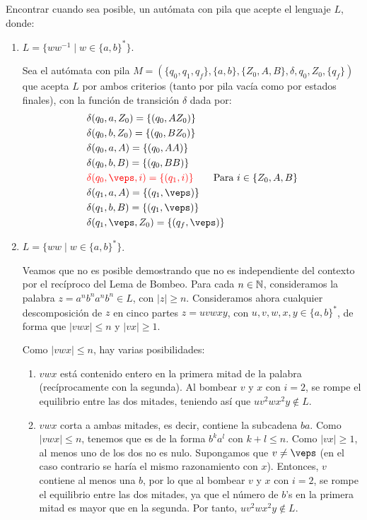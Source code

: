 \begin{ejercicio}\label{ej:1.6.2}
    Encontrar cuando sea posible, un autómata con pila que acepte el lenguaje $L$, donde:
    \begin{enumerate}
        \item \label{ej:1.6.2-1}
        $L = \{ww^{-1}\mid w\in {\{a,b\}}^{\ast}\}$.
        
        Sea el autómata con pila $M = (\{q_0,q_1,q_f\},\{a,b\},\{Z_0,A,B\},\delta,q_0,Z_0,\{q_f\})$ que acepta $L$ por ambos criterios (tanto por pila vacía como por estados finales), con la función de transición $\delta$ dada por:
        \begin{align*}
            &\delta(q_0,a,Z_0) = \{(q_0,AZ_0)\} \\
            &\delta(q_0,b,Z_0) = \{(q_0,BZ_0)\} \\
            &\delta(q_0,a,A) = \{(q_0,AA)\} \\
            &\delta(q_0,b,B) = \{(q_0,BB)\} \\
            &\red{\delta(q_0,\veps,i) = \{(q_1,i)\}} \qquad \text{Para } i\in \{Z_0,A,B\} \\
            &\delta(q_1,a,A) = \{(q_1,\veps)\} \\
            &\delta(q_1,b,B) = \{(q_1,\veps)\} \\
            &\delta(q_1,\veps,Z_0) = \{(q_f,\veps)\}
        \end{align*}
        \item $L = \{ww\mid w \in {\{a,b\}}^{\ast}\}$.
        
        Veamos que no es posible demostrando que no es independiente del contexto por el recíproco del Lema de Bombeo. Para cada $n\in \mathbb{N}$, consideramos la palabra $z=a^nb^na^nb^n\in L$, con $|z|\geq n$. Consideramos ahora cualquier descomposición de $z$ en cinco partes $z=uvwxy$, con $u,v,w,x,y\in {\{a,b\}}^{\ast}$, de forma que $|vwx|\leq n$ y $|vx|\geq 1$.

        Como $|vwx|\leq n$, hay varias posibilidades:
        \begin{enumerate}
            \item $vwx$ está contenido entero en la primera mitad de la palabra (recíprocamente con la segunda). Al bombear $v$ y $x$ con $i=2$, se rompe el equilibrio entre las dos mitades, teniendo así que $uv^2wx^2y\notin L$.
            \item $vwx$ corta a ambas mitades, es decir, contiene la subcadena $ba$. Como $|vwx|\leq n$, tenemos que es de la forma $b^k a^l$ con $k+l\leq n$. Como $|vx|\geq 1$, al menos uno de los dos no es nulo. Supongamos que $v\neq \veps$ (en el caso contrario se haría el mismo razonamiento con $x$). Entonces, $v$ contiene al menos una $b$, por lo que al bombear $v$ y $x$ con $i=2$, se rompe el equilibrio entre las dos mitades, ya que el número de $b$'s en la primera mitad es mayor que en la segunda. Por tanto, $uv^2wx^2y\notin L$.
        \end{enumerate}


\end{enumerate}
\end{ejercicio}
